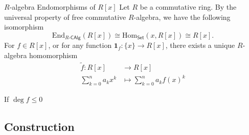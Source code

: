 \begin{example}{$R$-algebra Endomorphisms of $R[x]$}{}
    Let $R$ be a commutative ring. By the universal property of free commutative $R$-algebra, we have the following isomorphism
    \[
    \mathrm{End}_{R\text{-}\mathsf{CAlg}}(R[x])\cong \mathrm{Hom}_{\mathsf{Set}}(x,R[x])\cong R[x].
    \]
    For $f\in R[x]$, or for any function $\mathbf{1}_f:\{x\}\to R[x]$, there exists a unique $R$-algebra homomorphism 
    \begin{align*}
        \widetilde{f}:R[x]&\longrightarrow R[x]\\
        \sum_{k=0}^n a_k x^k &\longmapsto \sum_{k=0}^n a_k f(x)^k
    \end{align*}
    
    If $\deg f\le 0$
\end{example}

\subsection{Construction}

